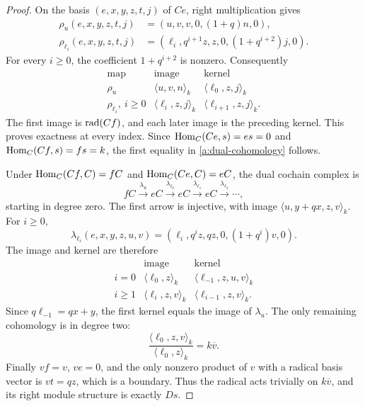 \begin{proof}
On the basis \((e,x,y,z,t,j)\) of \(Ce\), right multiplication gives
\begin{align*}
\rho_u(e,x,y,z,t,j)
  &=(u,v,v,0,(1+q)n,0),\\
\rho_{\ell_i}(e,x,y,z,t,j)
  &=(\ell_i,q^{i+1}z,z,0,(1+q^{i+2})j,0).
\end{align*}
For every \(i\ge0\), the coefficient \(1+q^{i+2}\) is nonzero.
Consequently
\[
\begin{array}{c|c|c}
\text{map}&\text{image}&\text{kernel}\\ \hline
\rho_u
 &\langle u,v,n\rangle_k
 &\langle\ell_0,z,j\rangle_k\\
\rho_{\ell_i},\ i\ge0
 &\langle\ell_i,z,j\rangle_k
 &\langle\ell_{i+1},z,j\rangle_k.
\end{array}
\]
The first image is \(\operatorname{rad}(Cf)\), and each later image is the preceding
kernel.  This proves exactness at every index.  Since
\(\operatorname{Hom}_C(Ce,s)=es=0\) and \(\operatorname{Hom}_C(Cf,s)=fs=k\), the first equality
in \eqref{a:dual-cohomology} follows.

Under \(\operatorname{Hom}_C(Cf,C)=fC\) and \(\operatorname{Hom}_C(Ce,C)=eC\), the dual cochain
complex is
\begin{equation}
fC\xrightarrow{\lambda_u}eC
 \xrightarrow{\lambda_{\ell_0}}eC
 \xrightarrow{\lambda_{\ell_1}}eC
 \xrightarrow{\lambda_{\ell_2}}\cdots,
\label{a:dual-complex}
\end{equation}
starting in degree zero.  The first arrow is injective, with image
\(\langle u,y+qx,z,v\rangle_k\).  For \(i\ge0\),
\[
\lambda_{\ell_i}(e,x,y,z,u,v)
  =(\ell_i,q^iz,qz,0,(1+q^i)v,0).
\]
The image and kernel are therefore
\[
\begin{array}{c|c|c}
 &\text{image}&\text{kernel}\\ \hline
i=0&\langle\ell_0,z\rangle_k
 &\langle\ell_{-1},z,u,v\rangle_k\\
i\ge1&\langle\ell_i,z,v\rangle_k
 &\langle\ell_{i-1},z,v\rangle_k.
\end{array}
\]
Since \(q\ell_{-1}=qx+y\), the first kernel equals the image of
\(\lambda_u\).  The only remaining cohomology is in degree two:
\[
\frac{\langle\ell_0,z,v\rangle_k}
     {\langle\ell_0,z\rangle_k}=k\overline v.
\]
Finally \(vf=v\), \(ve=0\), and the only nonzero product of \(v\)
with a radical basis vector is \(vt=qz\), which is a boundary.
Thus the radical acts trivially on \(k\overline v\), and its right
module structure is exactly \(Ds\).
\end{proof}

